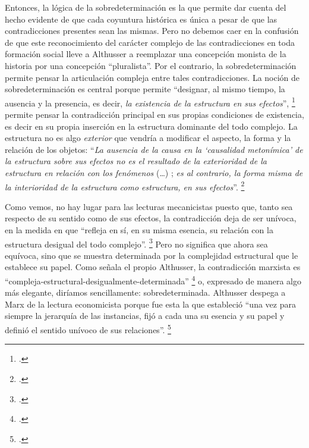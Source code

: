 Entonces, la lógica de la sobredeterminación es la que permite dar cuenta del hecho evidente de que cada coyuntura histórica es única a pesar de que las contradicciones presentes sean las mismas. Pero no debemos caer en la confusión de que este reconocimiento del carácter complejo de las contradicciones en toda formación social lleve a Althusser a reemplazar una concepción monista de la historia por una concepción \enquote{pluralista}. Por el contrario, la sobredeterminación permite pensar la articulación compleja entre tales contradicciones. La noción de sobredeterminación es central porque permite \enquote{designar, al mismo tiempo, la ausencia y la presencia, es decir, \emph{la existencia de la estructura en sus efectos}}, \footcite[][203]{@7035-ALTHUSSER1967} permite pensar la contradicción principal en sus propias condiciones de existencia, es decir en su propia inserción en la estructura dominante del todo complejo. La estructura no es algo \emph{exterior} que vendría a modificar el aspecto, la forma y la relación de los objetos: \enquote{\emph{La ausencia de la causa en la \enquote{causalidad metonímica} de la estructura sobre sus efectos no es el resultado de la exterioridad  \linebreak de la estructura en relación con los fenómenos} (\ldots) ; \emph{es al contrario, la forma misma de la interioridad de la estructura como estructura, en sus efectos}}. \footcite[][204]{@7035-ALTHUSSER1967}

Como vemos, no hay lugar para las lecturas mecanicistas puesto que, tanto sea respecto de su sentido como de sus efectos, la contradicción deja de ser unívoca, en la medida en que \enquote{refleja en sí, en su misma esencia, su relación con la estructura desigual del todo complejo}. \footcite[][173]{@7051-ALTHUSSER1965} Pero no significa que ahora sea equívoca, sino que se muestra determinada por la complejidad estructural que le establece su papel. Como señala el propio Althusser, la contradicción marxista es \enquote{compleja-estructural-desigualmente-determinada} \footcite[][174]{@7051-ALTHUSSER1965} o, expresado de manera algo más elegante, diríamos sencillamente: sobredeterminada. Althusser despega a Marx de la lectura economicista porque fue esta la que estableció \enquote{una vez para siempre la jerarquía de las instancias, fijó a cada una su esencia y su papel y definió el sentido unívoco de sus relaciones}. \footcite[][177]{@7051-ALTHUSSER1965}

